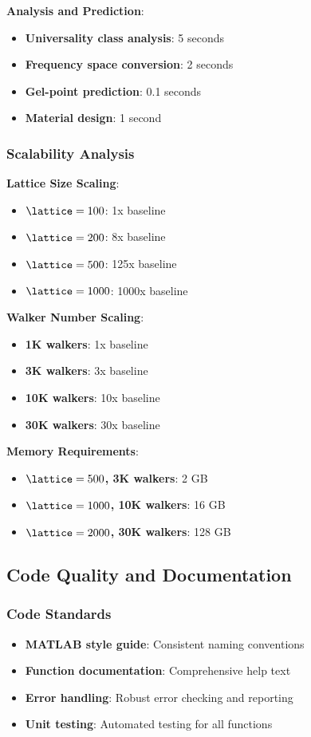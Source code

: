 \textbf{Analysis and Prediction}:
\begin{itemize}
    \item \textbf{Universality class analysis}: 5 seconds
    \item \textbf{Frequency space conversion}: 2 seconds
    \item \textbf{Gel-point prediction}: 0.1 seconds
    \item \textbf{Material design}: 1 second
\end{itemize}

\subsubsection{Scalability Analysis}
\textbf{Lattice Size Scaling}:
\begin{itemize}
    \item \textbf{$\lattice = 100$}: 1x baseline
    \item \textbf{$\lattice = 200$}: 8x baseline
    \item \textbf{$\lattice = 500$}: 125x baseline
    \item \textbf{$\lattice = 1000$}: 1000x baseline
\end{itemize}

\textbf{Walker Number Scaling}:
\begin{itemize}
    \item \textbf{1K walkers}: 1x baseline
    \item \textbf{3K walkers}: 3x baseline
    \item \textbf{10K walkers}: 10x baseline
    \item \textbf{30K walkers}: 30x baseline
\end{itemize}

\textbf{Memory Requirements}:
\begin{itemize}
    \item \textbf{$\lattice = 500$, 3K walkers}: 2 GB
    \item \textbf{$\lattice = 1000$, 10K walkers}: 16 GB
    \item \textbf{$\lattice = 2000$, 30K walkers}: 128 GB
\end{itemize}

\subsection{Code Quality and Documentation}

\subsubsection{Code Standards}
\begin{itemize}
    \item \textbf{MATLAB style guide}: Consistent naming conventions
    \item \textbf{Function documentation}: Comprehensive help text
    \item \textbf{Error handling}: Robust error checking and reporting
    \item \textbf{Unit testing}: Automated testing for all functions
\end{itemize}

